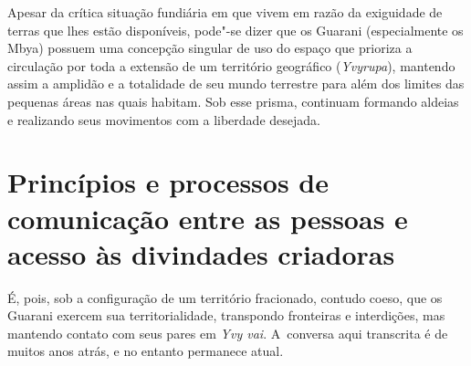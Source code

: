 Apesar da crítica situação fundiária em que vivem em razão da exiguidade
de terras que lhes estão disponíveis, pode"-se dizer que os Guarani
(especialmente os Mbya) possuem uma concepção singular de uso do espaço
que prioriza a circulação por toda a extensão de um território
geográfico (\emph{Yvyrupa}), mantendo assim a amplidão e a totalidade de seu
mundo terrestre para além dos limites das pequenas áreas nas quais
habitam. Sob esse prisma, continuam formando aldeias e realizando seus
movimentos com a liberdade desejada.

\section{Princípios e processos de comunicação entre as pessoas e acesso às
divindades criadoras} 

É, pois, sob a configuração de um território fracionado, contudo coeso,
que os Guarani exercem sua territorialidade, transpondo fronteiras e
interdições, mas mantendo contato com seus pares em \emph{Yvy vai}. A~conversa
aqui transcrita é de muitos anos atrás, e no entanto permanece atual. 


